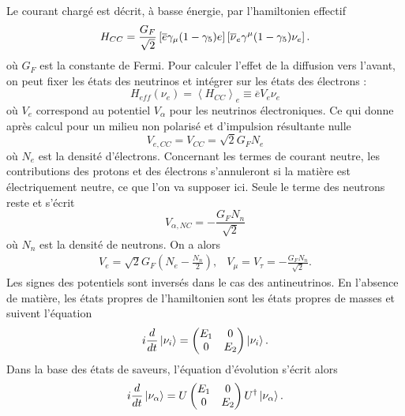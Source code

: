         Le courant chargé est décrit, à basse énergie, par l'hamiltonien effectif\cite{Akhmedov2000}
        \begin{equation}
          H_{CC} = \frac{G_F}{\sqrt{2}}\left[\overline{e}\gamma_{\mu}(1-\gamma_5)e\right]\left[\overline{\nu}_e\gamma^{\mu}(1-\gamma_5)\nu_e\right].
        \end{equation}
        où $G_F$ est la constante de Fermi. Pour calculer l'effet de la diffusion vers l'avant, on peut fixer les états des neutrinos et intégrer sur les états des électrons : 
        \begin{equation}
          H_{eff}(\nu_e) = \left<H_{CC}\right>_{e} \equiv \overline{e}V_e\nu_e
        \end{equation}
        où $V_e$ correspond au potentiel $V_{\alpha}$ pour les neutrinos électroniques. Ce qui donne après calcul pour un milieu non polarisé et d'impulsion résultante nulle\cite{Akhmedov2000}
        \begin{equation}
          V_{e,CC} = V_{CC} = \sqrt{2}G_F N_e
        \end{equation}
        où $N_e$ est la densité d'électrons. Concernant les termes de courant neutre, les contributions des protons et des électrons s'annuleront si la matière est électriquement neutre, ce que l'on va supposer ici. Seule le terme des neutrons reste et s'écrit 
        \begin{equation}
          V_{\alpha,NC} = -\frac{G_F N_n}{\sqrt{2}}
        \end{equation}
        où $N_n$ est la densité de neutrons. On a alors 
        \begin{eqnarray}
          V_e = \sqrt{2}G_F\left(N_e-\frac{N_n}{2}\right), & V_{\mu} = V_{\tau} = -\frac{G_F N_n}{\sqrt{2}}.
        \end{eqnarray}
        Les signes des potentiels sont inversés dans le cas des antineutrinos.
        En l'absence de matière, les états propres de l'hamiltonien sont les états propres de masses et suivent l'équation
        \begin{equation}
          i\frac{d}{dt}\ket{\nu_i} = \left(\begin{matrix}E_1 & 0 \\ 0 & E_2\end{matrix}\right)\ket{\nu_i}.
        \end{equation}
        Dans la base des états de saveurs, l'équation d'évolution s'écrit alors
        \begin{equation}\label{eq::evolution_matter_2flavor}
          i\frac{d}{dt}\ket{\nu_{\alpha}} = U\left(\begin{matrix}E_1 & 0 \\ 0 & E_2\end{matrix}\right)U^{\dagger}\ket{\nu_{\alpha}}.
        \end{equation}
